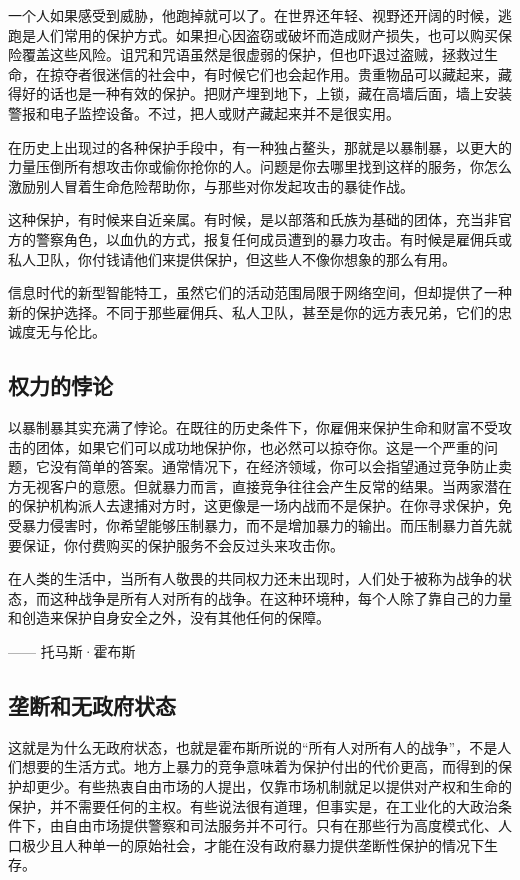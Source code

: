 一个人如果感受到威胁，他跑掉就可以了。在世界还年轻、视野还开阔的时候，逃跑是人们常用的保护方式。如果担心因盗窃或破坏而造成财产损失，也可以购买保险覆盖这些风险。诅咒和咒语虽然是很虚弱的保护，但也吓退过盗贼，拯救过生命，在掠夺者很迷信的社会中，有时候它们也会起作用。贵重物品可以藏起来，藏得好的话也是一种有效的保护。把财产埋到地下，上锁，藏在高墙后面，墙上安装警报和电子监控设备。不过，把人或财产藏起来并不是很实用。

在历史上出现过的各种保护手段中，有一种独占鳌头，那就是以暴制暴，以更大的力量压倒所有想攻击你或偷你抢你的人。问题是你去哪里找到这样的服务，你怎么激励别人冒着生命危险帮助你，与那些对你发起攻击的暴徒作战。

这种保护，有时候来自近亲属。有时候，是以部落和氏族为基础的团体，充当非官方的警察角色，以血仇的方式，报复任何成员遭到的暴力攻击。有时候是雇佣兵或私人卫队，你付钱请他们来提供保护，但这些人不像你想象的那么有用。

信息时代的新型智能特工，虽然它们的活动范围局限于网络空间，但却提供了一种新的保护选择。不同于那些雇佣兵、私人卫队，甚至是你的远方表兄弟，它们的忠诚度无与伦比。

\subsection{权力的悖论}
以暴制暴其实充满了悖论。在既往的历史条件下，你雇佣来保护生命和财富不受攻击的团体，如果它们可以成功地保护你，也必然可以掠夺你。这是一个严重的问题，它没有简单的答案。通常情况下，在经济领域，你可以会指望通过竞争防止卖方无视客户的意愿。但就暴力而言，直接竞争往往会产生反常的结果。当两家潜在的保护机构派人去逮捕对方时，这更像是一场内战而不是保护。在你寻求保护，免受暴力侵害时，你希望能够压制暴力，而不是增加暴力的输出。而压制暴力首先就要保证，你付费购买的保护服务不会反过头来攻击你。

\begin{tcolorbox}
\kaishu 在人类的生活中，当所有人敬畏的共同权力还未出现时，人们处于被称为战争的状态，而这种战争是所有人对所有的战争。在这种环境种，每个人除了靠自己的力量和创造来保护自身安全之外，没有其他任何的保障。 
\begin{flushright}
—— 托马斯·霍布斯    
\end{flushright}
\end{tcolorbox}

\subsection{垄断和无政府状态}

这就是为什么无政府状态，也就是霍布斯所说的“所有人对所有人的战争”，不是人们想要的生活方式。地方上暴力的竞争意味着为保护付出的代价更高，而得到的保护却更少。有些热衷自由市场的人提出，仅靠市场机制就足以提供对产权和生命的保护，并不需要任何的主权。有些说法很有道理，但事实是，在工业化的大政治条件下，由自由市场提供警察和司法服务并不可行。只有在那些行为高度模式化、人口极少且人种单一的原始社会，才能在没有政府暴力提供垄断性保护的情况下生存。

